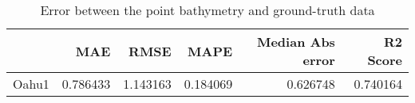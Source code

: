 \begin{table}[h!]
\caption{Error between the point bathymetry and ground-truth data}
\label{tab:Oahu1_lidar_error}
\begin{tabular}{lrrrrr}
\toprule
 & MAE & RMSE & MAPE & Median Abs error & R2 Score \\
\midrule
Oahu1 & 0.786433 & 1.143163 & 0.184069 & 0.626748 & 0.740164 \\
\bottomrule
\end{tabular}
\end{table}
